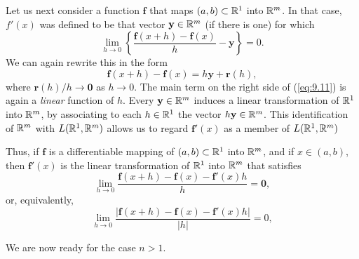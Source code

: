 \begin{mydef}
    Let us next consider a function $\mathbf{f}$ that maps $(a, b) \subset {\protect\mathbb R}^1$ into ${\protect\mathbb R}^m$. In that case, $f'(x)$ was defined to be that vector $\mathbf{y} \in {\protect\mathbb R}^m$ (if there is one) for which
    \begin{equation}
        \label{eq:9.10}
        \lim_{h \to 0} \left\{ \frac{\mathbf{f}(x+h) - \mathbf{f}(x)}{h} - \mathbf{y} \right\} = 0.
    \end{equation}
    We can again rewrite this in the form
    \begin{equation}
        \label{eq:9.11}
        \mathbf{f}(x+h) - \mathbf{f}(x) = h \mathbf{y} + \mathbf{r}(h) ,
    \end{equation}
    where $\mathbf{r}(h)/h \rightarrow \mathbf{0}$ as $h \rightarrow 0$.
    The main term on the right side of (\ref{eq:9.11}) is again a \emph{linear} function of $h$.
    Every $\mathbf{y} \in {\protect\mathbb R}^m$ induces a linear transformation of ${\protect\mathbb R}^1$ into ${\protect\mathbb R}^m$, by associating to each $h \in {\protect\mathbb R}^1$ the vector $h \mathbf{y} \in {\protect\mathbb R}^m$.
    This identification of ${\protect\mathbb R}^m$ with $L({\protect\mathbb R}^1, {\protect\mathbb R}^m)$ allows us to regard $\mathbf{f}'(x)$ as a member of $L({\protect\mathbb R}^1,{\protect\mathbb R}^m)$

    Thus, if $\mathbf{f}$ is a differentiable mapping of $(a,b) \subset {\protect\mathbb R}^1$ into ${\protect\mathbb R}^m$, and if $x \in (a,b)$,
    then $\mathbf{f}'(x)$ is the linear transformation of ${\protect\mathbb R}^1$ into ${\protect\mathbb R}^m$ that satisfies
    \begin{equation}
        \label{eq:9.12}
        \lim_{h \to 0} \frac{\mathbf{f}(x+h) - \mathbf{f}(x) - \mathbf{f}'(x)h}{h} = \mathbf{0},
    \end{equation}
    or, equivalently,
    \begin{equation}
        \label{eq:9.13}
        \lim_{h \to 0} \frac{\left| \mathbf{f}(x+h) - \mathbf{f}(x) - \mathbf{f}'(x)h \right|}{\left| h \right|} = 0,
    \end{equation}

    We are now ready for the case $n > 1$.
\end{mydef}

